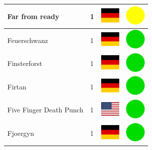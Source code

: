 \documentclass[12pt, a4paper, twoside]{report}
\begin{document}
\begin{center}
\begin{longtable}{|p{5cm}|p{2cm}|p{2cm}|p{2cm}|}
			Far from ready & 1 & \includegraphics[width=1cm]{4x3/de} & \includegraphics[width=1cm]{likes/m} \\ \hline
			Feuerschwanz & 1 & \includegraphics[width=1cm]{4x3/de} & \includegraphics[width=1cm]{likes/y} \\ \hline
			Finsterforst & 1 & \includegraphics[width=1cm]{4x3/de} & \includegraphics[width=1cm]{likes/y} \\ \hline
			Firtan & 1 & \includegraphics[width=1cm]{4x3/de} & \includegraphics[width=1cm]{likes/y} \\ \hline
			Five Finger Death Punch & 1 & \includegraphics[width=1cm]{4x3/us} & \includegraphics[width=1cm]{likes/y} \\ \hline
			Fjoergyn & 1 & \includegraphics[width=1cm]{4x3/de} & \includegraphics[width=1cm]{likes/y} \\ \hline

\end{longtable}
\end{center}
\end{document}
